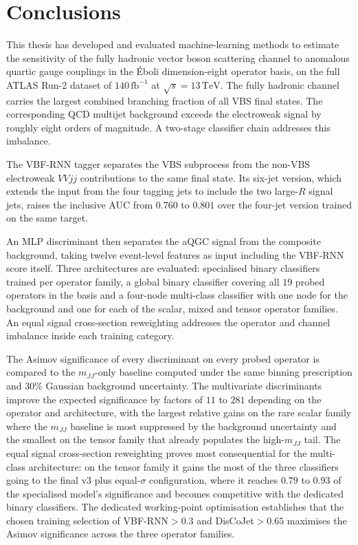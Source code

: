\chapter{Conclusions}
\label{chap:conclusion}

This thesis has developed and evaluated machine-learning methods to estimate the sensitivity of the fully hadronic vector boson scattering channel to anomalous quartic gauge couplings in the Éboli dimension-eight operator basis, on the full ATLAS Run-2 dataset of $140\,\mathrm{fb}^{-1}$ at $\sqrt{s}=13\,\mathrm{TeV}$. The fully hadronic channel carries the largest combined branching fraction of all VBS final states. The corresponding QCD multijet background exceeds the electroweak signal by roughly eight orders of magnitude. A two-stage classifier chain addresses this imbalance.

The VBF-RNN tagger separates the VBS subprocess from the non-VBS electroweak $VVjj$ contributions to the same final state. Its six-jet version, which extends the input from the four tagging jets to include the two large-$R$ signal jets, raises the inclusive AUC from $0.760$ to $0.801$ over the four-jet version trained on the same target.

An MLP discriminant then separates the aQGC signal from the composite background, taking twelve event-level features as input including the VBF-RNN score itself. Three architectures are evaluated: specialised binary classifiers trained per operator family, a global binary classifier covering all $19$ probed operators in the basis and a four-node multi-class classifier with one node for the background and one for each of the scalar, mixed and tensor operator families. An equal signal cross-section reweighting addresses the operator and channel imbalance inside each training category.

The Asimov significance of every discriminant on every probed operator is compared to the $m_{JJ}$-only baseline computed under the same binning prescription and $30\%$ Gaussian background uncertainty. The multivariate discriminants improve the expected significance by factors of $11$ to $281$ depending on the operator and architecture, with the largest relative gains on the rare scalar family where the $m_{JJ}$ baseline is most suppressed by the background uncertainty and the smallest on the tensor family that already populates the high-$m_{JJ}$ tail. The equal signal cross-section reweighting proves most consequential for the multi-class architecture: on the tensor family it gains the most of the three classifiers going to the final v3 plus equal-$\sigma$ configuration, where it reaches $0.79$ to $0.93$ of the specialised model's significance and becomes competitive with the dedicated binary classifiers. The dedicated working-point optimisation establishes that the chosen training selection of VBF-RNN${}>0.3$ and DisCoJet${}>0.65$ maximises the Asimov significance across the three operator families.

